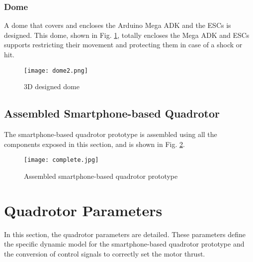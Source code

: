 \subsubsection{Dome}
A dome that covers and encloses the Arduino Mega ADK and the ESCs is designed. This dome, shown in Fig. \ref{fig:dome}, totally encloses the Mega ADK and ESCs supports restricting their movement and protecting them in case of a shock or hit.
\begin{figure}[H]
	\begin{center}
		\texttt{[image: dome2.png]}    
		\caption{3D designed dome} 
		\label{fig:dome}
	\end{center}
\end{figure}

\subsection{Assembled Smartphone-based Quadrotor}
The smartphone-based quadrotor prototype is assembled using all the components exposed in this section, and is shown in Fig. \ref{fig:completequad}.
\begin{figure}[H]
	\begin{center}
		\texttt{[image: complete.jpg]}    
		\caption{Assembled smartphone-based quadrotor prototype} 
		\label{fig:completequad}
	\end{center}
\end{figure}

\section{Quadrotor Parameters} \label{sec:parameters}
In this section, the quadrotor parameters are detailed. These parameters define the specific dynamic model for the smartphone-based quadrotor prototype and the conversion of control signals to correctly set the motor thrust.

